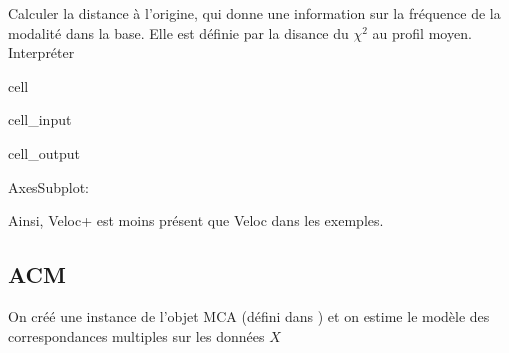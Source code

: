 \documentclass[letterpaper,10pt,french]{sphinxmanual}
\begin{document}
\sphinxAtStartPar
Calculer la distance à l’origine, qui  donne une information sur la fréquence de la modalité dans la base. Elle est définie par la disance du \(\chi^2\) au profil moyen. Interpréter

\begin{sphinxuseclass}{cell}
\begin{sphinxuseclass}{cell_input}
\begin{sphinxVerbatim}[commandchars=\\\{\}]
  \PYG{p}{[}\PYG{p}{]}

  


 
\end{sphinxVerbatim}

\end{sphinxuseclass}
\begin{sphinxuseclass}{cell_output}
\begin{sphinxVerbatim}[commandchars=\\\{\}]
\PYGZlt{}AxesSubplot:\PYGZgt{}
\end{sphinxVerbatim}

\noindent{}

\end{sphinxuseclass}
\end{sphinxuseclass}
\sphinxAtStartPar
Ainsi, Veloc+ est moins présent que Veloc\sphinxhyphen{} dans les exemples.


\subsection{ACM}
\label{\detokenize{TP3_AFC_ACM:acm}}
\sphinxAtStartPar
On créé une instance de l’objet MCA (défini dans ) et on estime le modèle des correspondances multiples sur les données \(X\)
\end{document}
